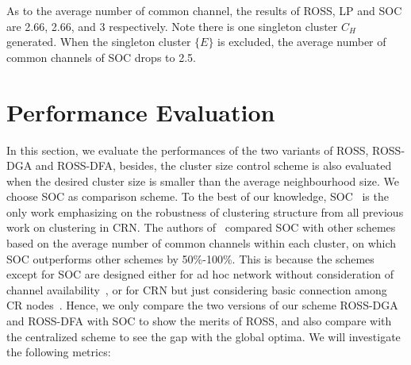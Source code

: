 As to the average number of common channel, the results of ROSS, LP and SOC are 2.66, 2.66, and 3 respectively. 
Note there is one singleton cluster $C_H$ generated.
When the singleton cluster $\{E\}$ is excluded, the average number of common channels of SOC drops to 2.5. 




\section{Performance Evaluation}
\label{performance}
In this section, we evaluate the performances of the two variants of ROSS, \ie ROSS-DGA and ROSS-DFA, besides, the cluster size control scheme is also evaluated when the desired cluster size is smaller than the average neighbourhood size.
We choose SOC as comparison scheme.
To the best of our knowledge, SOC~\cite{Lazos09} is the only work emphasizing on the robustness of clustering structure from all previous work on clustering in CRN. The authors of~\cite{Lazos09} compared SOC with other schemes based on the average number of common channels within each cluster, on which SOC outperforms other schemes by 50\%-100\%. This is because the schemes except for SOC are designed either for ad hoc network without consideration of channel availability~\cite{Basagni99}, or for CRN  but just considering basic connection among CR nodes~\cite{Zhao07}. Hence, we only compare the two versions of our scheme ROSS-DGA and ROSS-DFA with SOC to show the merits of ROSS, and also compare with the centralized scheme to see the gap with the global optima. 
We will investigate the following metrics:
